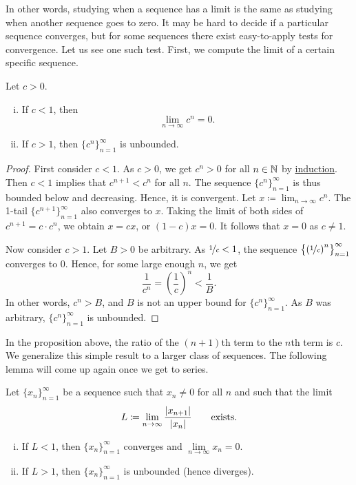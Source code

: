 In other words, studying when a sequence has a limit is 
the same as studying when another sequence goes to zero.
It may be hard to decide if a particular sequence converges, but
for some sequences there exist easy-to-apply tests for convergence.
Let us see one such test.
First, we compute the limit of a certain specific sequence.

\begin{prop}
Let $c > 0$.
\begin{enumerate}[(i)]
\item
If $c < 1$, then
\begin{equation*}
\lim_{n\to\infty} c^n = 0.
\end{equation*}
\item
If $c > 1$, then $\{ c^n \}_{n=1}^\infty$ is unbounded.
\end{enumerate}
\end{prop}

\begin{proof}
First consider $c < 1$.  As $c > 0$, we get $c^n > 0$ for all $n \in {\mathbb{N}}$ by
\hyperref[induction:thm]{induction}.  Then $c < 1$ implies that
$c^{n+1} < c^n$ for all $n$.
The sequence $\{ c^n \}_{n=1}^\infty$ is
thus
bounded below and
decreasing.  Hence, it is convergent.
Let $x \coloneqq \lim_{n\to\infty} c^n$.  The 1-tail $\{ c^{n+1} \}_{n=1}^\infty$
also converges to $x$.  Taking the limit of both sides of $c^{n+1} = c \cdot
c^n$, we obtain $x = cx$, or $(1-c)x=0$.  It follows that $x=0$ as $c \neq 1$.

Now consider $c > 1$.
Let $B > 0$ be arbitrary.
As $\nicefrac{1}{c} < 1$, the sequence $\bigl\{ {(\nicefrac{1}{c})}^n \bigr\}_{n=1}^\infty$
converges to $0$.
Hence, for some large enough $n$, we get
\begin{equation*}
\frac{1}{c^n} =
{\left(\frac{1}{c}\right)}^n < \frac{1}{B} .
\end{equation*}
In other words, $c^n > B$, and $B$ is not an upper bound for 
$\{ c^n \}_{n=1}^\infty$.  As $B$ was arbitrary, $\{ c^n \}_{n=1}^\infty$ is unbounded.
\end{proof}

In the proposition above, the
ratio of the $(n+1)$th term to the $n$th term is $c$.  We 
generalize this simple result to a larger class of sequences.
The following lemma will come up again once we get to series.

\begin{lemma}
\label{seq:ratiotest}
Let $\{ x_n \}_{n=1}^\infty$ be a sequence such that $x_n \neq 0$ for all $n$ and such that
the limit
\begin{equation*}
L \coloneqq \lim_{n\to\infty} \frac{\lvert {x_{n+1}} \rvert}{\lvert {x_n} \rvert}
\qquad
\text{exists.}
\end{equation*}
\begin{enumerate}[(i)]
\item
If $L < 1$, then $\{ x_n \}_{n=1}^\infty$ converges and $\lim\limits_{n\to\infty} x_n = 0$.
\item
If $L > 1$, then $\{ x_n \}_{n=1}^\infty$ is unbounded (hence diverges).
\end{enumerate}
\end{lemma}

